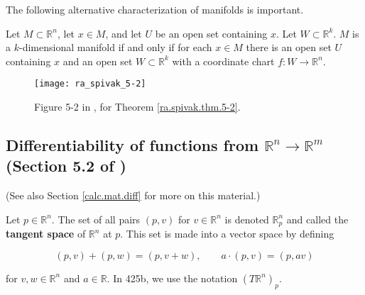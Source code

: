 The following alternative characterization of manifolds is important.

\begin{theorem}\label{ra.spivak.thm.5-2}

Let \(M \subset \mathbb{R}^n\), let \(x \in M\), and let \(U\) be an open set containing \(x\). Let \(W \subset \mathbb{R}^k\).  \(M\) is a \(k\)-dimensional manifold if and only if for each \(x \in M\) there is an open set \(U\) containing \(x\) and an open set \(W \subset \mathbb{R}^k\) with a coordinate chart \(f: W \to \mathbb{R}^n\).

\end{theorem}



\begin{figure}[htbp]
\begin{center}
\texttt{[image: ra\_spivak\_5-2]}
\caption{Figure 5-2 in \citet{spivak1971calculus}, for Theorem \ref{ra.spivak.thm.5-2}.}
\label{ra_spivak_5-2_fig}
\end{center}
\end{figure}


\subsection{Differentiability of functions from \(\mathbb{R}^n \to \mathbb{R}^m\) (Section 5.2 of \citet{pugh2015real})}\label{ra.lin.alg.5.2.pugh}

(See also Section \ref{calc.mat.diff} for more on this material.) 

\begin{definition}\label{ra.def.tangent.space.spivak}

Let \(p \in \mathbb{R}^n\). The set of all pairs \((p,v)\) for \(v \in \mathbb{R}^n\) is denoted \(\mathbb{R}^n_p\) and called the \textbf{tangent space} of \(\mathbb{R}^n\) at \(p\). This set is made into a vector space by defining 

\[
(p,v) + (p,w) = (p, v+ w), \qquad a \cdot (p , v) = (p, av)
\]

for \(v, w \in \mathbb{R}^n\) and \(a \in \mathbb{R}\). In 425b, we use the notation \((T\mathbb{R}^n)_p\).

\end{definition}


